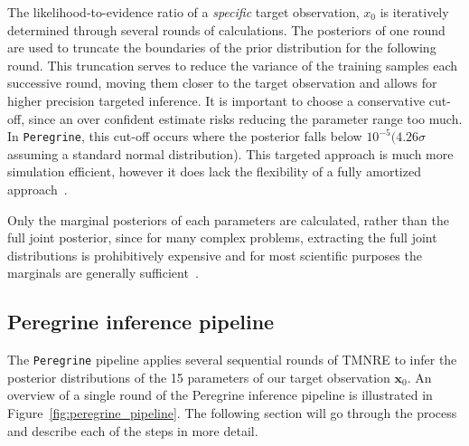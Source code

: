 The likelihood-to-evidence ratio of a \textit{specific} target observation, $x_0$ is iteratively determined through several rounds of calculations. The posteriors of one round are used to truncate the boundaries of the prior distribution for the following round. This truncation serves to reduce the variance of the training samples each successive round, moving them closer to the target observation and allows for higher precision targeted inference. It is important to choose a conservative cut-off, since an over confident estimate risks reducing the parameter range too much. In \texttt{Peregrine}, this cut-off occurs where the posterior falls below $10^{-5} (4.26\sigma$ assuming a standard normal distribution). This targeted approach is much more simulation efficient, however it does lack the flexibility of a fully amortized approach~\cite{Miller_TMNRE_2021}.  

Only the marginal posteriors of each parameters are calculated, rather than the full joint posterior, since for many complex problems, extracting the full joint distributions is prohibitively expensive and for most scientific purposes the marginals are generally sufficient~\cite{Miller_TMNRE_2021}. 


\subsection{Peregrine inference pipeline}
\label{sec:methodology_peregrine}

The \texttt{Peregrine} pipeline applies several sequential rounds of TMNRE to infer the posterior distributions of the 15 parameters of our target observation $\boldsymbol{x}_0$. An overview of a single round of the Peregrine inference pipeline is illustrated in Figure~\ref{fig:peregrine_pipeline}. The following section will go through the process and describe each of the steps in more detail.

